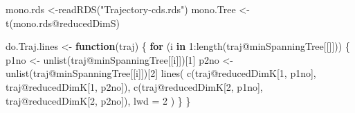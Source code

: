\documentclass[
]{book}
\newenvironment{Shaded}{\begin{snugshade}}{\end{snugshade}}
\newcommand{\AttributeTok}[1]{\textcolor[rgb]{0.77,0.63,0.00}{#1}}
\newcommand{\ControlFlowTok}[1]{\textcolor[rgb]{0.13,0.29,0.53}{\textbf{#1}}}
\newcommand{\DecValTok}[1]{\textcolor[rgb]{0.00,0.00,0.81}{#1}}
\newcommand{\FunctionTok}[1]{\textcolor[rgb]{0.00,0.00,0.00}{#1}}
\newcommand{\NormalTok}[1]{#1}
\newcommand{\OtherTok}[1]{\textcolor[rgb]{0.56,0.35,0.01}{#1}}
\newcommand{\SpecialCharTok}[1]{\textcolor[rgb]{0.00,0.00,0.00}{#1}}
\newcommand{\StringTok}[1]{\textcolor[rgb]{0.31,0.60,0.02}{#1}}
\begin{document}
\begin{Shaded}
\end{Shaded}

\begin{Shaded}
\begin{Highlighting}[]
\NormalTok{mono.rds }\OtherTok{\textless{}{-}}\FunctionTok{readRDS}\NormalTok{(}\StringTok{"Trajectory{-}cds.rds"}\NormalTok{)}
\NormalTok{mono.Tree }\OtherTok{\textless{}{-}} \FunctionTok{t}\NormalTok{(mono.rds}\SpecialCharTok{@}\NormalTok{reducedDimS)}
\end{Highlighting}
\end{Shaded}

\begin{Shaded}
\begin{Highlighting}[]
\NormalTok{do.Traj.lines }\OtherTok{\textless{}{-}} \ControlFlowTok{function}\NormalTok{(traj) \{}
  \ControlFlowTok{for}\NormalTok{ (i }\ControlFlowTok{in} \DecValTok{1}\SpecialCharTok{:}\FunctionTok{length}\NormalTok{(traj}\SpecialCharTok{@}\NormalTok{minSpanningTree[[]])) \{}
\NormalTok{    p1no }\OtherTok{\textless{}{-}} \FunctionTok{unlist}\NormalTok{(traj}\SpecialCharTok{@}\NormalTok{minSpanningTree[[i]])[}\DecValTok{1}\NormalTok{]}
\NormalTok{    p2no }\OtherTok{\textless{}{-}} \FunctionTok{unlist}\NormalTok{(traj}\SpecialCharTok{@}\NormalTok{minSpanningTree[[i]])[}\DecValTok{2}\NormalTok{]}
    \FunctionTok{lines}\NormalTok{(}
      \FunctionTok{c}\NormalTok{(traj}\SpecialCharTok{@}\NormalTok{reducedDimK[}\DecValTok{1}\NormalTok{, p1no],}
\NormalTok{        traj}\SpecialCharTok{@}\NormalTok{reducedDimK[}\DecValTok{1}\NormalTok{, p2no]),}
      \FunctionTok{c}\NormalTok{(traj}\SpecialCharTok{@}\NormalTok{reducedDimK[}\DecValTok{2}\NormalTok{, p1no],}
\NormalTok{        traj}\SpecialCharTok{@}\NormalTok{reducedDimK[}\DecValTok{2}\NormalTok{, p2no]),}
      \AttributeTok{lwd =} \DecValTok{2}
\NormalTok{    )}
\NormalTok{  \}}
\NormalTok{\}}
\end{Highlighting}
\end{Shaded}
\end{document}

